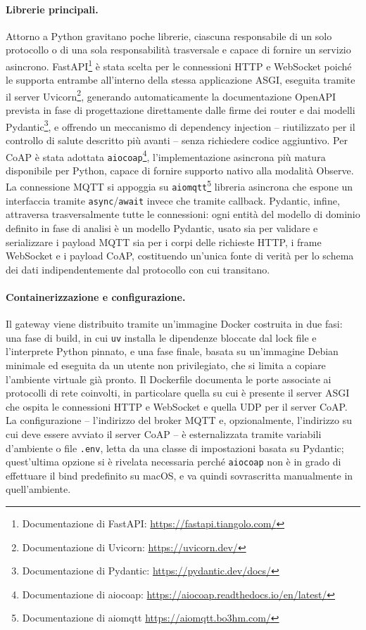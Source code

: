 \paragraph{Librerie principali.}
Attorno a Python gravitano poche librerie, ciascuna responsabile di un solo protocollo o di una sola responsabilità trasversale e capace di fornire un servizio asincrono. FastAPI\footnote{Documentazione di FastAPI: \url{https://fastapi.tiangolo.com/}} è stata scelta per le connessioni \ac{HTTP} e WebSocket poiché le supporta entrambe all'interno della stessa applicazione \ac{ASGI}, eseguita tramite il server Uvicorn\footnote{Documentazione di Uvicorn: \url{https://uvicorn.dev/}}, generando automaticamente la documentazione \ac{OpenAPI} prevista in fase di progettazione direttamente dalle firme dei router e dai modelli Pydantic\footnote{Documentazione di Pydantic: \url{https://pydantic.dev/docs/}}, e offrendo un meccanismo di dependency injection -- riutilizzato per il controllo di salute descritto più avanti -- senza richiedere codice aggiuntivo. Per \ac{CoAP} è stata adottata \texttt{aiocoap}\footnote{Documentazione di aiocoap: \url{https://aiocoap.readthedocs.io/en/latest/}}, l'implementazione asincrona più matura disponibile per Python, capace di fornire supporto nativo alla modalità Observe. La connessione \ac{MQTT} si appoggia su \texttt{aiomqtt}\footnote{Documentazione di aiomqtt \url{https://aiomqtt.bo3hm.com/}} libreria asincrona che espone un interfaccia tramite \texttt{async}/\texttt{await} invece che tramite callback. Pydantic, infine, attraversa trasversalmente tutte le connessioni: ogni entità del modello di dominio definito in fase di analisi è un modello Pydantic, usato sia per validare e serializzare i payload \ac{MQTT} sia per i corpi delle richieste \ac{HTTP}, i frame WebSocket e i payload \ac{CoAP}, costituendo un'unica fonte di verità per lo schema dei dati indipendentemente dal protocollo con cui transitano.

\paragraph{Containerizzazione e configurazione.}
Il gateway viene distribuito tramite un'immagine Docker costruita in due fasi: una fase di build, in cui \texttt{uv} installa le dipendenze bloccate dal lock file e l'interprete Python pinnato, e una fase finale, basata su un'immagine Debian minimale ed eseguita da un utente non privilegiato, che si limita a copiare l'ambiente virtuale già pronto. Il Dockerfile documenta le porte associate ai protocolli di rete coinvolti, in particolare quella su cui è presente il server \ac{ASGI} che ospita le connessioni \ac{HTTP} e WebSocket e quella \ac{UDP} per il server \ac{CoAP}. La configurazione -- l'indirizzo del broker \ac{MQTT} e, opzionalmente, l'indirizzo su cui deve essere avviato il server \ac{CoAP} -- è esternalizzata tramite variabili d'ambiente o file \texttt{.env}, letta da una classe di impostazioni basata su Pydantic; quest'ultima opzione si è rivelata necessaria perché \texttt{aiocoap} non è in grado di effettuare il bind predefinito su macOS, e va quindi sovrascritta manualmente in quell'ambiente.

